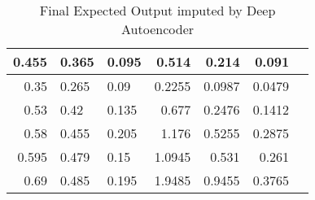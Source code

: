 \begin{table} [htbp]
\caption{Final Expected Output imputed by Deep Autoencoder}
\begin{tabular}{|r|l|l|r|r|r|l|}
\hline
\multicolumn{1}{|l|}{0.455} & 0.365 & 0.095 &  0.514 &  0.214 & 0.091 \\ \hline
0.35 & 0.265 & 0.09 & 0.2255 & 0.0987 & 0.0479 \\ \hline
0.53 & 0.42 & 0.135 & 0.677 & 0.2476 & 0.1412  \\ \hline
0.58	 & 0.455 & 	0.205 & 	1.176 & 	0.5255 & 	0.2875\\ \hline
0.595  & 0.479 & 0.15 & 1.0945 & 0.531 & 0.261 \\ \hline
0.69 & 0.485 & 0.195 & 1.9485 & 0.9455 & 0.3765 \\ 
\hline

\end{tabular}
\label{expected_output}
\end{table}